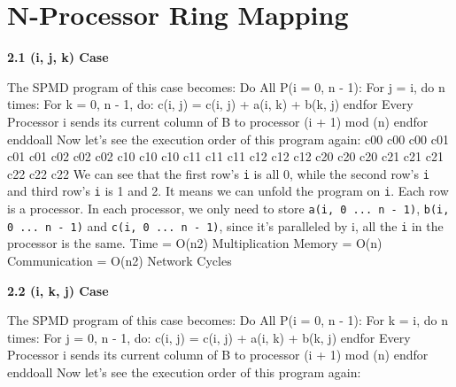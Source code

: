 \documentclass{article}%
\newenvironment{code}%
   {\snugshade\verbatim}%
   {\endverbatim\endsnugshade}
\begin{document}
\section{N-Processor Ring Mapping}
\begin{Large}

\begin{LARGE}
\begin{flushleft}
\textbf{2.1 (i, j, k) Case}
\end{flushleft}
\end{LARGE}
The SPMD program of this case becomes:
\begin{code}
    Do All P(i = 0, n - 1):
        For j = i, do n times:
            For k = 0, n - 1, do:
                c(i, j) = c(i, j) + a(i, k) + b(k, j)
            endfor
        Every Processor i sends its current 
        column of B to processor (i + 1) mod (n)
        endfor
    enddoall
\end{code}
Now let's see the execution order of this program again:
\begin{code}
    c00 c00 c00 c01 c01 c01 c02 c02 c02 
    c10 c10 c10 c11 c11 c11 c12 c12 c12
    c20 c20 c20 c21 c21 c21 c22 c22 c22
\end{code}
We can see that the first row's \texttt{i} is all 0, while the second row's \texttt{i} and third row's \texttt{i} is 1 and 2. It means we can unfold the program on \texttt{i}. Each row is a processor. In each processor, we only need to store \texttt{a(i, 0 ... n - 1)}, \texttt{b(i, 0 ... n - 1)} and \texttt{c(i, 0 ... n - 1)}, since it's paralleled by i, all the \texttt{i} in the processor is the same.
\newpage
\begin{code}
Time = O(n2) Multiplication
Memory = O(n)
Communication = O(n2) Network Cycles
\end{code}
\begin{LARGE}
\begin{flushleft}
\textbf{2.2 (i, k, j) Case}
\end{flushleft}
\end{LARGE}
The SPMD program of this case becomes:
\begin{code}
    Do All P(i = 0, n - 1):
        For k = i, do n times:
            For j = 0, n - 1, do:
                c(i, j) = c(i, j) + a(i, k) + b(k, j)
            endfor
        Every Processor i sends its current 
        column of B to processor (i + 1) mod (n)
        endfor
    enddoall
\end{code}
Now let's see the execution order of this program again:
\begin{code}

\end{code}
\end{Large}
\end{document}
